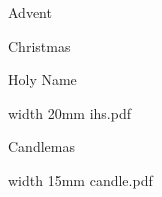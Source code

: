 
\vfill


%

\eject


\beginpart Advent



\paginaproxima


\bigskip


\paginaproxima

\beginpart Christmas


\paginaproxima


\paginaproxima


\paginaproxima

\beginpart Holy Name


\bigskip



\saveimageresource width 20mm {ihs.pdf}

\centerline{\useimageresource \lastsavedimageresourceindex}



\eject


\bigskip

\bigskip



\eject

\beginpart Candlemas


\bigskip

\saveimageresource width 15mm {candle.pdf}

\centerline{\useimageresource \lastsavedimageresourceindex}



